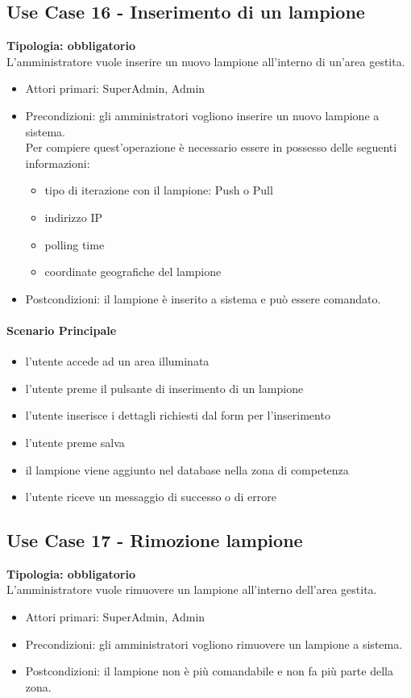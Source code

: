 \documentclass[12pt]{article}
\begin{document}
\subsection{Use Case 16 - Inserimento di un lampione}
\textbf{Tipologia: obbligatorio}\\
L'amministratore vuole inserire un nuovo lampione all'interno di un'area gestita.
\begin{itemize}
	\item Attori primari: SuperAdmin, Admin
	\item Precondizioni: gli amministratori vogliono inserire un nuovo lampione a sistema.\\
	 Per compiere quest'operazione è necessario essere in possesso delle seguenti informazioni: 
	\begin{itemize}
		\item tipo di iterazione con il lampione: Push o Pull
		\item indirizzo IP
		\item polling time
		\item coordinate geografiche del lampione
	\end{itemize}
	\item Postcondizioni: il lampione è inserito a sistema e può essere comandato.
\end{itemize}
\paragraph{Scenario Principale}
\begin{itemize}
	\item l'utente accede ad un area illuminata
	\item l'utente preme il pulsante di inserimento di un lampione
	\item l'utente inserisce i dettagli richiesti dal form per l'inserimento
	\item l'utente preme salva
	\item il lampione viene aggiunto nel database nella zona di competenza
	\item l'utente riceve un messaggio di successo o di errore
\end{itemize}


\subsection{Use Case 17 - Rimozione lampione}
\textbf{Tipologia: obbligatorio}\\
L'amministratore vuole rimuovere un lampione all'interno dell'area gestita.
\begin{itemize}
	\item Attori primari: SuperAdmin, Admin
	\item Precondizioni: gli amministratori vogliono rimuovere un lampione a sistema.\\
	\item Postcondizioni: il lampione non è più comandabile e non fa più parte della zona.
\end{itemize}
\end{document}

